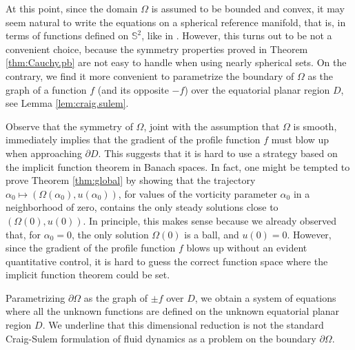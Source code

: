 \documentclass[10pt,reqno,a4paper]{article}
\numberwithin{equation}{section}
\theoremstyle{plain}
\theoremstyle{definition}
\renewcommand{\S}{{\mathbb S}}
\renewcommand{\a}{\alpha}
\newcommand{\Om}{\Omega}
\newcommand{\pa}{\partial}
\begin{document}
At this point, since the domain $\Omega$ is assumed to be bounded and convex, 
it may seem natural to write the equations on a spherical reference manifold,
that is, in terms of functions defined on $\S^2$, like in \cite{BJL, BLL}.
However, this turns out to be not a convenient choice, 
because the symmetry properties proved in Theorem \ref{thm:Cauchy.pb} 
are not easy to handle when using nearly spherical sets. 
On the contrary, we find it more convenient to parametrize the boundary of $\Omega$ 
as the graph of a function $f$ (and its opposite $-f$) 
over the equatorial planar region $D$, see Lemma \ref{lem:craig.sulem}.
 

Observe that the symmetry of $\Omega$, joint with the assumption that $\Omega$ is smooth, 
immediately implies that the gradient of the profile function $f$ must blow up 
when approaching $\pa D$. 
This suggests that it is hard to use a strategy based on the implicit function theorem in Banach spaces. 
In fact, one might be tempted to prove Theorem \ref{thm:global} by showing that 
the trajectory $\alpha_0 \mapsto (\Omega(\alpha_0), u(\a_0))$, 
for values of the vorticity parameter $\alpha_0$ in a neighborhood of zero,
contains the only steady solutions close to $(\Om(0), u(0))$. 
In principle, this makes sense because we already observed that, 
for $\alpha_0=0$, the only solution $\Omega (0)$ is a ball, and $u(0) = 0$. 
However, since the gradient of the profile function $f$ blows up 
without an evident quantitative control,
it is hard to guess the correct function space where the implicit function theorem could be set.  

Parametrizing $\pa \Omega$ as the graph of $\pm f$ over $D$, we obtain 
a system of equations where all the unknown functions are defined 
on the unknown equatorial planar region $D$. 
We underline that this dimensional reduction is not the standard Craig-Sulem formulation 
of fluid dynamics as a problem on the boundary $\pa \Omega$.
\end{document}
